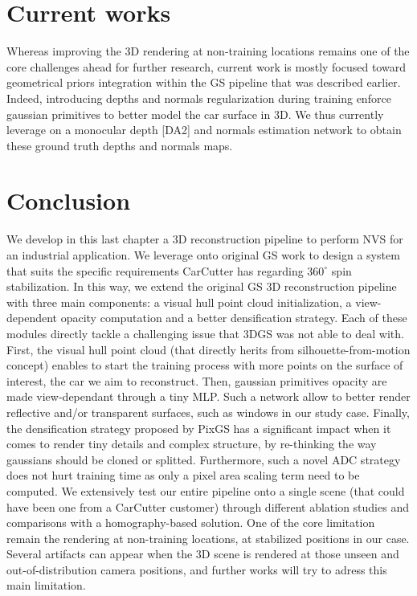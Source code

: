 \section{Current works}
Whereas improving the 3D rendering at non-training locations remains one of the core challenges ahead for further research, current work is mostly focused toward geometrical priors integration within the \ac{GS} pipeline that was described earlier. Indeed, introducing depths and normals regularization during training enforce gaussian primitives to better model the car surface in 3D. 
We thus currently leverage on a monocular depth [DA2] and normals estimation network to obtain these ground truth depths and normals maps. 



\section{Conclusion}

We develop in this last chapter a 3D reconstruction pipeline to perform \ac{NVS} for an industrial application. We leverage onto original \ac{GS} \citep{kerbl20233d} work to design a system that suits the specific requirements CarCutter has regarding $360^{\circ}$ spin stabilization. In this way, we extend the original \ac{GS} 3D reconstruction pipeline with three main components: a visual hull point cloud initialization, a view-dependent opacity computation and a better densification strategy. Each of these modules directly tackle a challenging issue that 3DGS was not able to deal with. First, the visual hull point cloud (that directly herits from silhouette-from-motion concept) enables to start the training process with more points on the surface of interest, the car we aim to reconstruct. Then, gaussian primitives opacity are made view-dependant through a tiny MLP. Such a network allow to better render reflective and/or transparent surfaces, such as windows in our study case. Finally, the densification strategy proposed by PixGS \citep{zhang2024pixel} has a significant impact when it comes to render tiny details and complex structure, by re-thinking the way gaussians should be cloned or splitted. Furthermore, such a novel \ac{ADC} strategy does not hurt training time as only a pixel area scaling term need to be computed. We extensively test our entire pipeline onto a single scene (that could have been one from a CarCutter customer) through different ablation studies and comparisons with a homography-based solution. One of the core limitation remain the rendering at non-training locations, \ie at stabilized positions in our case. Several artifacts can appear when the 3D scene is rendered at those unseen and out-of-distribution camera positions, and further works will try to adress this main limitation. 



